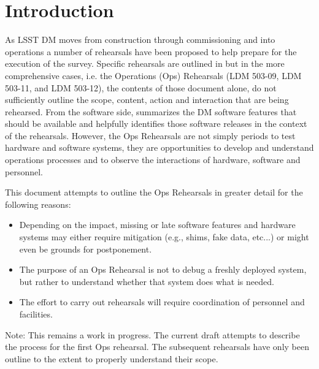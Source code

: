 
\section{Introduction}

As LSST DM moves from construction through commissioning and into operations 
a number of rehearsals have been proposed to help prepare for the execution 
of the survey.  Specific rehearsals are outlined in  but in 
the more comprehensive cases, i.e. the Operations (Ops) Rehearsals (LDM 503-09, LDM 503-11, and 
LDM 503-12), the contents of those document alone, do not sufficiently outline 
the scope, content, action and interaction that are being rehearsed.  
From the software side, 
summarizes the DM software features that should be available and helpfully 
identifies those software releases in the context of the rehearsals.  
However, the Ops Rehearsals are not simply periods to test hardware and 
software systems, they are opportunities to develop and understand operations 
processes and to observe the interactions of hardware, software and personnel.

This document attempts to outline the Ops Rehearsals in greater detail for the following reasons:
\begin{itemize}
\item Depending on the impact, missing or late software features and hardware systems may either
require mitigation (e.g., shims, fake data, etc...) or might even be grounds for 
postponement.
\item The purpose of an Ops Rehearsal is not to debug 
a freshly deployed system, but rather to understand whether that system does
what is needed.
\item The effort to carry out rehearsals will 
require coordination of personnel and facilities.
\end{itemize}

Note: This remains a work in progress.  The current draft attempts to describe the 
process for the first Ops rehearsal.  The subsequent rehearsals have only been 
outline to the extent to properly understand their scope.

\clearpage







